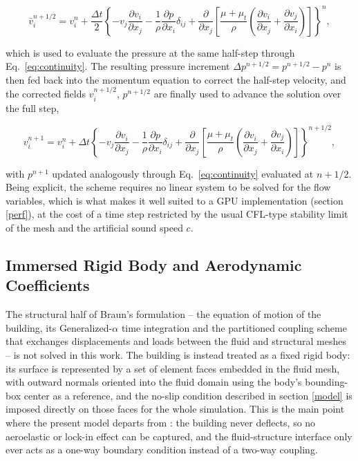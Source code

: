\documentclass{article}
\begin{document}
\begin{equation}
\bar{v}_i^{n+1/2} = v_i^n + \frac{\Delta t}{2}\left\{-v_j\frac{\partial v_i}{\partial x_j} - \frac{1}{\rho}\frac{\partial p}{\partial x_i}\delta_{ij} + \frac{\partial}{\partial x_j}\left[\frac{\mu+\mu_t}{\rho}\left(\frac{\partial v_i}{\partial x_j}+\frac{\partial v_j}{\partial x_i}\right)\right]\right\}^n,
\label{eq:predictor}
\end{equation}

which is used to evaluate the pressure at the same half-step through Eq.~\eqref{eq:continuity}. The resulting pressure increment $\Delta p^{n+1/2} = p^{n+1/2}-p^n$ is then fed back into the momentum equation to correct the half-step velocity, and the corrected fields $v_i^{n+1/2}$, $p^{n+1/2}$ are finally used to advance the solution over the full step,

\begin{equation}
v_i^{n+1} = v_i^n + \Delta t\left\{-v_j\frac{\partial v_i}{\partial x_j} - \frac{1}{\rho}\frac{\partial p}{\partial x_i}\delta_{ij} + \frac{\partial}{\partial x_j}\left[\frac{\mu+\mu_t}{\rho}\left(\frac{\partial v_i}{\partial x_j}+\frac{\partial v_j}{\partial x_i}\right)\right]\right\}^{n+1/2},
\label{eq:corrector}
\end{equation}

with $p^{n+1}$ updated analogously through Eq.~\eqref{eq:continuity} evaluated at $n+1/2$. Being explicit, the scheme requires no linear system to be solved for the flow variables, which is what makes it well suited to a GPU implementation (section \ref{perf}), at the cost of a time step restricted by the usual CFL-type stability limit of the mesh and the artificial sound speed $c$.

\subsection{Immersed Rigid Body and Aerodynamic Coefficients} \label{immersed}

The structural half of Braun's formulation \cite{braun09} -- the equation of motion of the building, its Generalized-$\alpha$ time integration and the partitioned coupling scheme that exchanges displacements and loads between the fluid and structural meshes -- is not solved in this work. The building is instead treated as a fixed rigid body: its surface is represented by a set of element faces embedded in the fluid mesh, with outward normals oriented into the fluid domain using the body's bounding-box center as a reference, and the no-slip condition described in section \ref{model} is imposed directly on those faces for the whole simulation. This is the main point where the present model departs from \cite{braun09}: the building never deflects, so no aeroelastic or lock-in effect can be captured, and the fluid-structure interface only ever acts as a one-way boundary condition instead of a two-way coupling.
\end{document}
